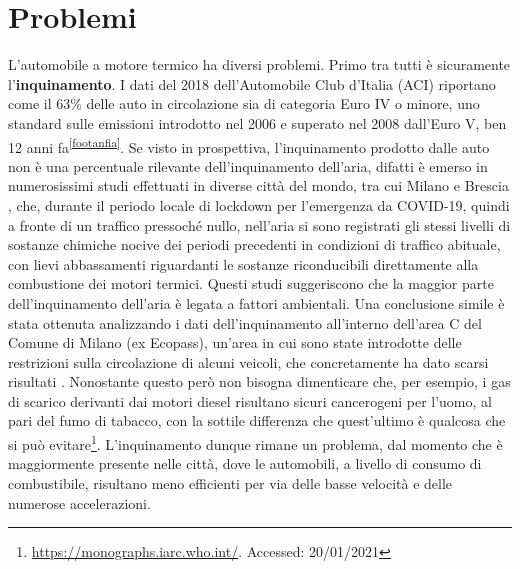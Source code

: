 \section{Problemi}


L'automobile a motore termico ha diversi problemi. Primo tra tutti è sicuramente l'\textbf{inquinamento}. I dati del 2018 dell'Automobile Club d'Italia (ACI) riportano come il 63\% delle auto in circolazione sia di categoria Euro IV o minore, uno standard sulle emissioni introdotto nel 2006 e superato nel 2008 dall'Euro V, ben 12 anni fa\textsuperscript{\ref{footanfia}}. Se visto in prospettiva, l'inquinamento prodotto dalle auto non è una percentuale rilevante dell'inquinamento dell'aria, difatti è emerso in numerosissimi studi effettuati in diverse città del mondo, tra cui Milano e Brescia \cite{collivignarelli2021analysis}\cite{cameletti2020effect}, che, durante il periodo locale di lockdown per l'emergenza da COVID-19,  quindi a fronte di un traffico pressoché nullo, nell'aria si sono registrati gli stessi livelli di sostanze chimiche nocive dei periodi precedenti in condizioni di traffico abituale, con lievi abbassamenti riguardanti le sostanze riconducibili direttamente alla combustione dei motori termici. Questi studi suggeriscono che la maggior parte dell'inquinamento dell'aria è legata a fattori ambientali. Una conclusione simile è stata ottenuta analizzando i dati dell'inquinamento all'interno dell'area C del Comune di Milano (ex Ecopass), un'area in cui sono state introdotte delle restrizioni sulla circolazione di alcuni veicoli, che concretamente ha dato scarsi risultati \cite{trentini2014lombardy}. Nonostante questo però non bisogna dimenticare che, per esempio, i gas di scarico derivanti dai motori diesel risultano sicuri cancerogeni per l'uomo, al pari del fumo di tabacco, con la sottile differenza che quest'ultimo è qualcosa che si può evitare\footnote{\url{https://monographs.iarc.who.int/}. Accessed: 20/01/2021}. L'inquinamento dunque rimane un problema, dal momento che è maggiormente presente nelle città, dove le automobili, a livello di consumo di combustibile, risultano meno efficienti per via delle basse velocità e delle numerose accelerazioni.

